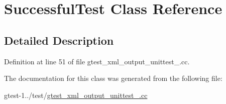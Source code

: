 \hypertarget{classSuccessfulTest}{\section{\-Successful\-Test \-Class \-Reference}
\label{dc/dd1/classSuccessfulTest}
}


\subsection{\-Detailed \-Description}


\-Definition at line 51 of file gtest\-\_\-xml\-\_\-output\-\_\-unittest\-\_\-.\-cc.



\-The documentation for this class was generated from the following file\-:\begin{DoxyCompactItemize}
\item 
gtest-\/1../test/\hyperlink{gtest__xml__output__unittest___8cc}{gtest\-\_\-xml\-\_\-output\-\_\-unittest\-\_\-.\-cc}\end{DoxyCompactItemize}
